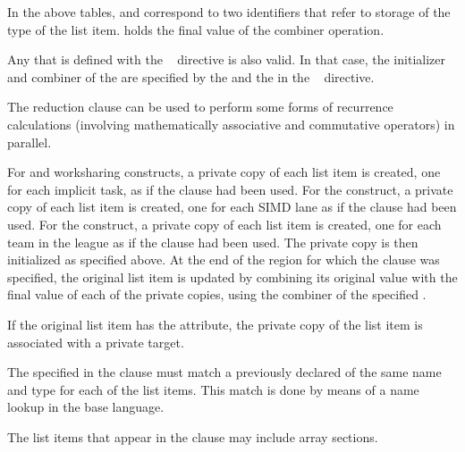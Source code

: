 {{{{\linenumbers

\fortranspecificend
\vspace{\baselineskip}

In the above tables,  and  correspond to
two identifiers that refer to storage of the type of the list
item.  holds the final value of the combiner operation.

Any  that is defined with the ~ directive is 
also valid. In that case, the initializer and combiner of the  are 
specified by the  and the  in the ~ 
directive.

\descr
The reduction clause can be used to perform some forms of recurrence calculations 
(involving mathematically associative and commutative operators) in parallel.

For  and worksharing constructs, a private copy of each list item is created, 
one for each implicit task, as if the  clause had been used. For the  
construct, a private copy of each list item is created, one for each SIMD lane as if the 
 clause had been used. For the  construct, a private copy of each list 
item is created, one for each team in the league as if the  clause had been 
used. The private copy is then initialized as specified above. At the end of the region for 
which the  clause was specified, the original list item is updated by 
combining its original value with the final value of each of the private copies, using the 
combiner of the specified .

\pagebreak

\begin{samepage}
\fortranspecificstart
If the original list item has the  attribute, the
private copy of the list item is associated with a private target.
\fortranspecificend
\end{samepage}

The  specified in the  clause must match a previously 
declared  of the same name and type for each of the list items. This 
match is done by means of a name lookup in the base language. 

\ccppspecificstart
The list items that appear in the  clause may include array sections.
\ccppspecificend

}}}}
